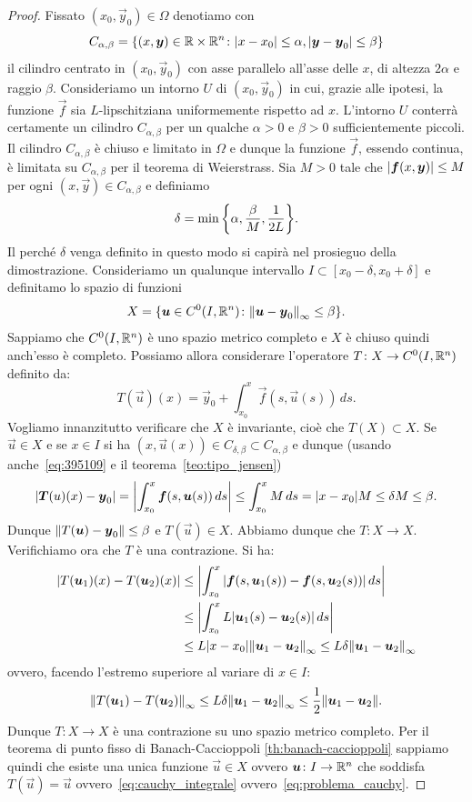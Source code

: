 \begin{proof}
Fissato $(x_0, \vec y_0)\in \Omega$ denotiamo con
\[
  C_{\alpha,\beta} =
  {\left\{ (x,\boldsymbol y)\in \mathbb R\times\mathbb R^n\colon {\left|x-x_0\right|}\le \alpha, {\left|\boldsymbol y -\boldsymbol y_0\right|}\le \beta \right\}}
\]
il cilindro centrato in $(x_0, \vec y_0)$ con asse parallelo all'asse delle $x$,
di altezza $2\alpha$ e raggio $\beta$.
Consideriamo un intorno $U$ di $(x_0,\vec y_0)$ in cui, grazie alle ipotesi,
la funzione $\vec f$ sia $L$-lipschitziana uniformemente rispetto ad $x$.
L'intorno $U$ conterrà certamente un cilindro $C_{\alpha,\beta}$ per un qualche $\alpha>0$ e $\beta>0$
sufficientemente piccoli.
Il cilindro $C_{\alpha,\beta}$ è chiuso e limitato in $\Omega$ e dunque la funzione $\vec f$,
essendo continua, è limitata su $C_{\alpha,\beta}$ per il teorema di Weierstrass.
Sia $M>0$ tale che ${\left|\boldsymbol f(x,\boldsymbol y)\right|}\le M$ per ogni
$(x,\vec y) \in C_{\alpha,\beta}$ e definiamo
\begin{equation}\label{eq:395109}
 \delta = \min{\left\{ \alpha, \frac{\beta}{M}, \frac{1}{2L} \right\}}.
\end{equation}
Il perché $\delta$ venga definito in questo modo si capirà nel prosieguo della dimostrazione.
Consideriamo un qualunque intervallo $I\subset [x_0-\delta,x_0+\delta]$ e
definitamo lo spazio di funzioni
\[
X=\{\boldsymbol u\in C^0(I,\mathbb R^n)\colon {\left\Vert \boldsymbol u-\boldsymbol y_0\right\Vert}_\infty
\le \beta \}.
\]
Sappiamo che $C^0(I,\mathbb R^n)$ è uno spazio metrico completo e $X$ è chiuso quindi
anch'esso è completo. Possiamo allora considerare l'operatore
$T\colon X \to C^0(I, \mathbb R^n)$ definito da:
\[
  T(\vec u)(x) = \vec y_0 + \int_{x_0}^x \vec f(s, \vec u(s))\, ds.
\]
Vogliamo innanzitutto verificare che $X$ è invariante,
cioè che $T(X)\subset X$.
Se $\vec u \in X$ e se $x\in I$ si ha
$(x,\vec u(x)) \in C_{\delta,\beta} \subset C_{\alpha,\beta}$
e dunque (usando anche~\eqref{eq:395109} e il teorema~\ref{teo:tipo_jensen})
\[
  {\left|\boldsymbol T(u)(x)-\boldsymbol y_0\right|}
  = {\left|\int_{x_0}^x \boldsymbol f(s,\boldsymbol u(s))\, ds\right|}
  \le \int_{x_0}^x M\, ds = {\left|x-x_0\right|} M \le \delta M
  \le \beta.
\]
Dunque ${\left\Vert T(\boldsymbol u)-\boldsymbol y_0\right\Vert}\le \beta$ e $T(\vec u)\in X$.
Abbiamo dunque che $T\colon X \to X$. Verifichiamo ora che $T$ è una contrazione.
Si ha:
\begin{align*}
  {\left|T(\boldsymbol u_1)(x)-T(\boldsymbol u_2)(x)\right|}
   &\le {\left|\int_{x_0}^x{\left|\boldsymbol f(s,\boldsymbol u_1(s))-\boldsymbol f(s,\boldsymbol u_2(s))\right|}\, ds\right|}\\
   &\le {\left|\int_{x_0}^x L{\left|\boldsymbol u_1(s)-\boldsymbol u_2(s)\right|}\, ds\right|}\\
   &\le L {\left|x-x_0\right|}{\left\Vert \boldsymbol u_1 - \boldsymbol u_2\right\Vert}_\infty
   \le L \delta {\left\Vert \boldsymbol u_1 - \boldsymbol u_2\right\Vert}_\infty
\end{align*}
ovvero, facendo l'estremo superiore al variare di $x\in I$:
\[
 {\left\Vert T(\boldsymbol u_1)-T(\boldsymbol u_2)\right\Vert}_\infty
 \le L \delta {\left\Vert \boldsymbol u_1 - \boldsymbol u_2\right\Vert}_\infty
 \le \frac{1}{2}{\left\Vert \boldsymbol u_1- \boldsymbol u_2\right\Vert}.
\]
Dunque $T\colon X \to X$ è una contrazione su uno spazio metrico completo.
Per il teorema di punto fisso di Banach-Caccioppoli
\ref{th:banach-caccioppoli}
sappiamo quindi che esiste una unica funzione
$\vec u \in X$ ovvero $\boldsymbol u \colon I \to \mathbb R^n$ che soddisfa
$T(\vec u)=\vec u$ ovvero~\eqref{eq:cauchy_integrale}
ovvero~\eqref{eq:problema_cauchy}.
\end{proof}

